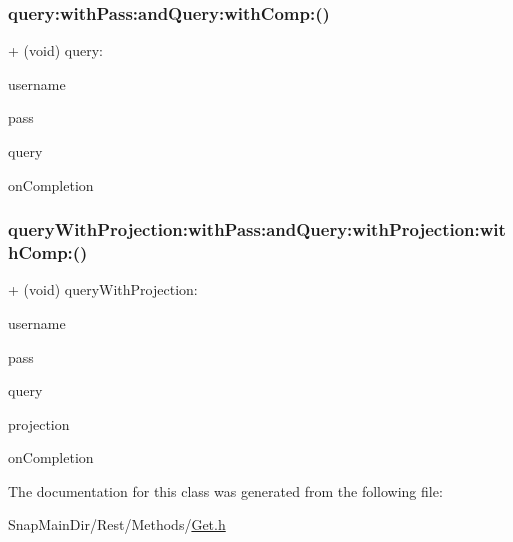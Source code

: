 \hypertarget{interface_get_adbd4ada23c895311921cbf56982df2b8}{}\label{interface_get_adbd4ada23c895311921cbf56982df2b8} 
\subsubsection{\texorpdfstring{query\+:with\+Pass\+:and\+Query\+:with\+Comp\+:()}{query:withPass:andQuery:withComp:()}}
{\footnotesize\ttfamily + (void) query\+: \begin{DoxyParamCaption}\item[{(N\+S\+String $\ast$)}]{username }\item[{withPass:(N\+S\+String $\ast$)}]{pass }\item[{andQuery:(N\+S\+String $\ast$)}]{query }\item[{withComp:(void($^\wedge$)(B\+O\+OL, id))}]{on\+Completion }\end{DoxyParamCaption}}

\hypertarget{interface_get_a204cd698f188114cc013c76616964a6a}{}\label{interface_get_a204cd698f188114cc013c76616964a6a} 
\subsubsection{\texorpdfstring{query\+With\+Projection\+:with\+Pass\+:and\+Query\+:with\+Projection\+:with\+Comp\+:()}{queryWithProjection:withPass:andQuery:withProjection:withComp:()}}
{\footnotesize\ttfamily + (void) query\+With\+Projection\+: \begin{DoxyParamCaption}\item[{(N\+S\+String $\ast$)}]{username }\item[{withPass:(N\+S\+String $\ast$)}]{pass }\item[{andQuery:(N\+S\+String $\ast$)}]{query }\item[{withProjection:(N\+S\+String $\ast$)}]{projection }\item[{withComp:(void($^\wedge$)(B\+O\+OL, id))}]{on\+Completion }\end{DoxyParamCaption}}



The documentation for this class was generated from the following file\+:\begin{DoxyCompactItemize}
\item 
Snap\+Main\+Dir/\+Rest/\+Methods/\hyperlink{_get_8h}{Get.\+h}\end{DoxyCompactItemize}
